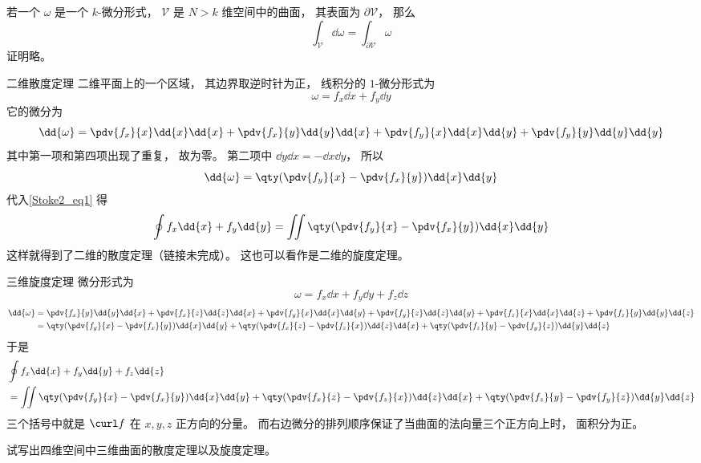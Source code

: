 

若一个 $\omega$ 是一个 $k$-微分形式， $\mathcal V$ 是 $N> k$ 维空间中的曲面， 其表面为 $\partial \mathcal V$， 那么
\begin{equation}\label{Stoke2_eq1}
\int_{\mathcal V} \dd{\omega} = \int_{\partial \mathcal V} \omega
\end{equation}
证明略。

\begin{example}{二维散度定理}
二维平面上的一个区域， 其边界取逆时针为正， 线积分的 $1$-微分形式为
\begin{equation}
\omega = f_x \dd{x} + f_y \dd{y}
\end{equation}
它的微分为
\begin{equation}
\dd{\omega} = \pdv{f_x}{x}\dd{x}\dd{x} + \pdv{f_x}{y}\dd{y}\dd{x}
+ \pdv{f_y}{x}\dd{x}\dd{y} + \pdv{f_y}{y}\dd{y}\dd{y}
\end{equation}
其中第一项和第四项出现了重复， 故为零。 第二项中 $\dd{y}\dd{x} = -\dd{x}\dd{y}$， 所以
\begin{equation}
\dd{\omega} = \qty(\pdv{f_y}{x}-\pdv{f_x}{y})\dd{x}\dd{y}
\end{equation}
代入\autoref{Stoke2_eq1} 得
\begin{equation}
\oint f_x \dd{x} + f_y \dd{y} = \iint \qty(\pdv{f_y}{x}-\pdv{f_x}{y})\dd{x}\dd{y}
\end{equation}
这样就得到了二维的散度定理（链接未完成）。 这也可以看作是二维的旋度定理。
\end{example}

\begin{example}{三维旋度定理}
微分形式为
\begin{equation}
\omega = f_x \dd{x} + f_y \dd{y} + f_z \dd{z}
\end{equation}
\begin{equation}
\begin{aligned}
\dd{\omega} &= \pdv{f_x}{y}\dd{y}\dd{x} + \pdv{f_x}{z}\dd{z}\dd{x}
+ \pdv{f_y}{x}\dd{x}\dd{y} + \pdv{f_y}{z}\dd{z}\dd{y}
+ \pdv{f_z}{x}\dd{x}\dd{z} + \pdv{f_z}{y}\dd{y}\dd{z}\\
&= \qty(\pdv{f_y}{x}-\pdv{f_x}{y})\dd{x}\dd{y}
+ \qty(\pdv{f_x}{z}- \pdv{f_z}{x})\dd{z}\dd{x}
+ \qty(\pdv{f_z}{y}-\pdv{f_y}{z})\dd{y}\dd{z}
\end{aligned}
\end{equation}
于是
\begin{equation}
\begin{aligned}
&\oint f_x \dd{x} + f_y \dd{y} + f_z \dd{z}\\
&= \iint \qty(\pdv{f_y}{x}-\pdv{f_x}{y})\dd{x}\dd{y}
+ \qty(\pdv{f_x}{z}- \pdv{f_z}{x})\dd{z}\dd{x}
+ \qty(\pdv{f_z}{y}-\pdv{f_y}{z})\dd{y}\dd{z}
\end{aligned}
\end{equation}
三个括号中就是 $\curl f$ 在 $x,y,z$ 正方向的分量。 而右边微分的排列顺序保证了当曲面的法向量三个正方向上时， 面积分为正。
\end{example}

\begin{exercise}{}
试写出四维空间中三维曲面的散度定理以及旋度定理。
\end{exercise}

